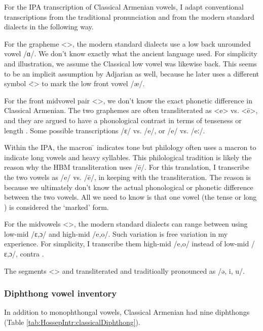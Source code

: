 For the IPA transcription of Classical Armenian vowels, I adapt conventional transcriptions from the traditional pronunciation and from the modern standard dialects in the following way. 


For the grapheme <>, the modern standard dialects use a low back unrounded vowel /ɑ/. We don't know exactly what the ancient language used. For simplicity and illustration, we assume the Classical low vowel was likewise back. This seems to be an implicit assumption by Adjarian as well, because he later uses a different symbol <̈> to mark the low front vowel /æ/. 

For the front midvowel pair <>, we don't know the exact phonetic difference in Classical Armenian. The two graphemes are often transliterated as <e> vs. <ē>, and they are argued to have a phonological contrast in terms of tenseness \cite[14]{Thomson-1989-IntroClassicalArmenian} or length \citep[6]{Godel-1975-IntroClassicalArmenian}. Some  possible transcriptions /ɛ/ vs. /e/,  or /e/ vs. /eː/. 

Within the IPA, the macron   ̄  indicates tone but philology often uses a macron to indicate long vowels and heavy syllables. This philological tradition is likely the reason why the HBM transliteration uses /ē/. For this translation,   I transcribe the two vowels as /e/ vs. /ē/, in keeping with the transliteration. The reason is because we ultimately don't know the actual phonological or phonetic  difference between the two vowels. All we need to know is that one vowel (the tense or long ) is considered the `marked' form. 


For the midvowels <>, the modern standard dialects can range between using low-mid /ɛ,ɔ/ and high-mid /e,o/. Such variation is free variation in my experience. For simplicity, I transcribe them high-mid /e,o/ instead of low-mid /ɛ,ɔ/, contra \citet[1039]{Macak-2017-PhonoClassicalArmenian}. 

The segments <> and transliterated and traditioally pronounced as /ə, i, u/. 

\subsubsection{Diphthong vowel inventory}\label{sec:HossepIntro:phonotransc:Classical:Diphthong}
In addition to monophthongal vowels, Classical Armenian had nine diphthongs (Table \ref{tab:HossepIntr:classicalDiphthong}). 


